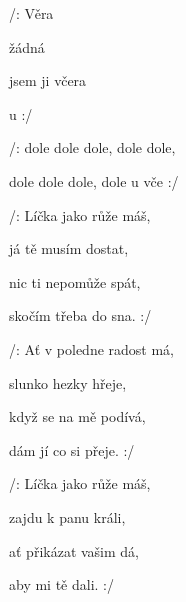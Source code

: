 

\zs
/:  Věra 

 žádná 

 jsem ji včera 

 u  :/
\ks

\zr
/:  dole dole dole,  dole dole,

 dole dole dole, dole u vče :/
\kr

\zs
/: Líčka jako růže máš,

já tě musím dostat,

nic ti nepomůže spát,

skočím třeba do sna. :/
\ks

\zr  \kr

\zs
/: Ať v poledne radost má,

slunko hezky hřeje,

když se na mě podívá,

dám jí co si přeje. :/
\ks

\zr  \kr

\zs
/: Líčka jako růže máš,

zajdu k panu králi,

ať přikázat vašim dá,

aby mi tě dali. :/
\ks

\zr  \kr

\kp

























